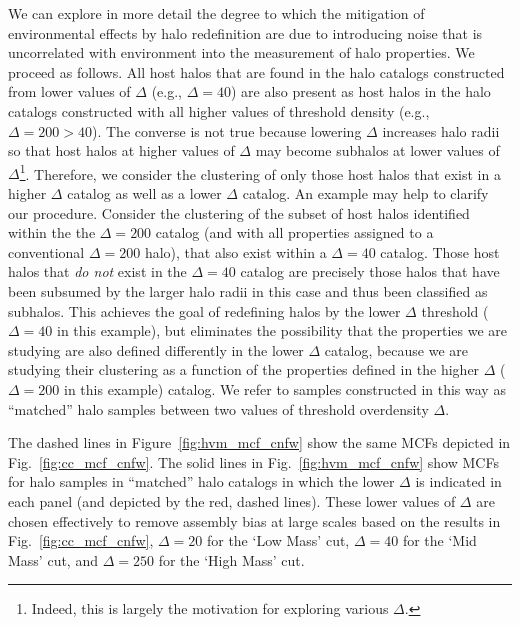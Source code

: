 \documentclass[usenatbib,fleqn]{mnras}
\begin{document}
We can explore in more detail the degree to which the mitigation of environmental effects by halo redefinition are due to introducing noise that is uncorrelated with environment into the measurement of halo properties. We proceed as follows. All host halos that are found in the halo catalogs constructed from lower values of $\Delta$ (e.g., $\Delta=40$) are also present as host halos in the halo catalogs constructed with all higher values of threshold density (e.g., $\Delta=200>40$). The converse is not true because lowering $\Delta$ increases halo radii so that host halos at higher values of $\Delta$ may become subhalos at lower values of $\Delta$\footnote{Indeed, this is largely the motivation for exploring various $\Delta$.}. Therefore, we consider the clustering of only those host halos that exist in a higher $\Delta$ catalog as well as a lower $\Delta$ catalog. An example may help to clarify our procedure. Consider the clustering of the subset of host halos identified within the the $\Delta=200$ catalog (and with all properties assigned to a conventional $\Delta=200$ halo), that also exist within a $\Delta=40$ catalog. Those host halos that {\em do not} exist in the $\Delta=40$ catalog are precisely those halos that have been subsumed by the larger halo radii in this case and thus been classified as subhalos. This achieves the goal of redefining halos by the lower $\Delta$ threshold ($\Delta=40$ in this example), but eliminates the possibility that the properties we are studying are also defined differently in the lower $\Delta$ catalog, because we are studying their clustering as a function of the properties defined in the higher $\Delta$ ($\Delta=200$ in this example) catalog. We refer to samples constructed in this way as ``matched'' halo samples between two values of threshold overdensity $\Delta$. 


The dashed lines in Figure~\ref{fig:hvm_mcf_cnfw} show the same MCFs depicted 
in Fig.~\ref{fig:cc_mcf_cnfw}. The solid lines in Fig.~\ref{fig:hvm_mcf_cnfw} show MCFs for halo samples in ``matched'' halo catalogs in which the lower $\Delta$ is indicated in each panel (and depicted by the red, dashed lines). These lower 
values of $\Delta$ are chosen effectively to remove assembly bias at large scales based on the results in Fig.~\ref{fig:cc_mcf_cnfw}, 
$\Delta=20$ for the `Low Mass' cut, 
$\Delta=40$ for the `Mid Mass' cut, 
and $\Delta=250$ for the `High Mass' cut. 
\end{document}
